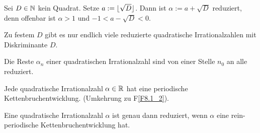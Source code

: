 	Sei $D \in \mathbb{N}$ kein Quadrat. Setze $a := \lfloor\sqrt{D}\rfloor$. Dann ist $\alpha := a + \sqrt{D}$ reduziert, denn offenbar ist $\alpha > 1$ und $-1 <  a - \sqrt{D} < 0$.
	
\begin{lemma} \label{lemma_8.2}
	Zu festem $D$ gibt es nur endlich viele reduzierte quadratische Irrationalzahlen mit Diskriminante $D$.
\end{lemma}

\begin{lemma} \label{lemma_8.3}
	Die Reste $\alpha_n$ einer quadratischen Irrationalzahl sind von einer Stelle $n_0$ an alle reduziert.
\end{lemma}

\begin{satz} \label{satz_8.2_2}
	Jede quadratische Irrationalzahl $\alpha \in \mathbb{R}$ hat eine periodische Kettenbruchentwicklung. (Umkehrung zu F\ref{F8.1_2}).
\end{satz}

	Eine quadratische Irrationalzahl $\alpha$ ist genau dann reduziert, wenn $\alpha$ eine rein-periodische Kettenbruchentwicklung hat.
\newpage